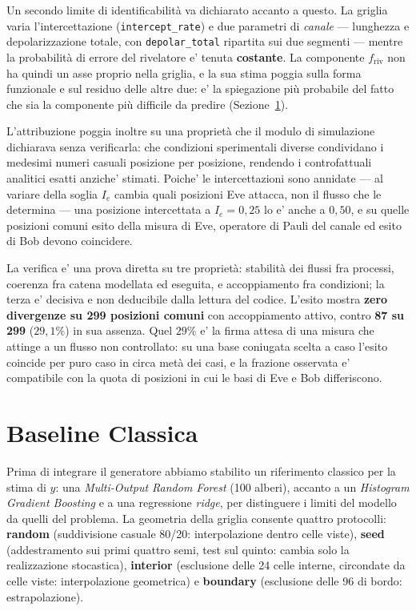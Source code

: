 \documentclass[10pt,conference,a4paper,twocolumn]{IEEEtran}
\begin{document}
Un secondo limite di identificabilità va dichiarato accanto a questo. La griglia varia l'intercettazione (\texttt{intercept\_rate}) e due parametri di \emph{canale} — lunghezza e depolarizzazione totale, con \texttt{depolar\_total} ripartita sui due segmenti — mentre la probabilità di errore del rivelatore e' tenuta \textbf{costante}. La componente $f_{\text{riv}}$ non ha quindi un asse proprio nella griglia, e la sua stima poggia sulla forma funzionale e sul residuo delle altre due: e' la spiegazione più probabile del fatto che sia la componente più difficile da predire (Sezione~\ref{sec:baseline}).

L'attribuzione poggia inoltre su una proprietà che il modulo di simulazione dichiarava senza verificarla: che condizioni sperimentali diverse condividano i medesimi numeri casuali posizione per posizione, rendendo i controfattuali analitici esatti anziche' stimati. Poiche' le intercettazioni sono annidate — al variare della soglia $I_e$ cambia quali posizioni Eve attacca, non il flusso che le determina — una posizione intercettata a $I_e = 0{,}25$ lo e' anche a $0{,}50$, e su quelle posizioni comuni esito della misura di Eve, operatore di Pauli del canale ed esito di Bob devono coincidere.

La verifica e' una prova diretta su tre proprietà: stabilità dei flussi fra processi, coerenza fra catena modellata ed eseguita, e accoppiamento fra condizioni; la terza e' decisiva e non deducibile dalla lettura del codice. L'esito mostra \textbf{zero divergenze su 299 posizioni comuni} con accoppiamento attivo, contro \textbf{87 su 299} ($29{,}1\%$) in sua assenza. Quel $29\%$ e' la firma attesa di una misura che attinge a un flusso non controllato: su una base coniugata scelta a caso l'esito coincide per puro caso in circa metà dei casi, e la frazione osservata e' compatibile con la quota di posizioni in cui le basi di Eve e Bob differiscono.

\section{Baseline Classica}
\label{sec:baseline}

Prima di integrare il generatore abbiamo stabilito un riferimento classico per la stima di $y$: una \textit{Multi-Output Random Forest} (100 alberi), accanto a un \textit{Histogram Gradient Boosting} e a una regressione \textit{ridge}, per distinguere i limiti del modello da quelli del problema. La geometria della griglia consente quattro protocolli: \textbf{random} (suddivisione casuale 80/20: interpolazione dentro celle viste), \textbf{seed} (addestramento sui primi quattro semi, test sul quinto: cambia solo la realizzazione stocastica), \textbf{interior} (esclusione delle 24 celle interne, circondate da celle viste: interpolazione geometrica) e \textbf{boundary} (esclusione delle 96 di bordo: estrapolazione).
\end{document}
